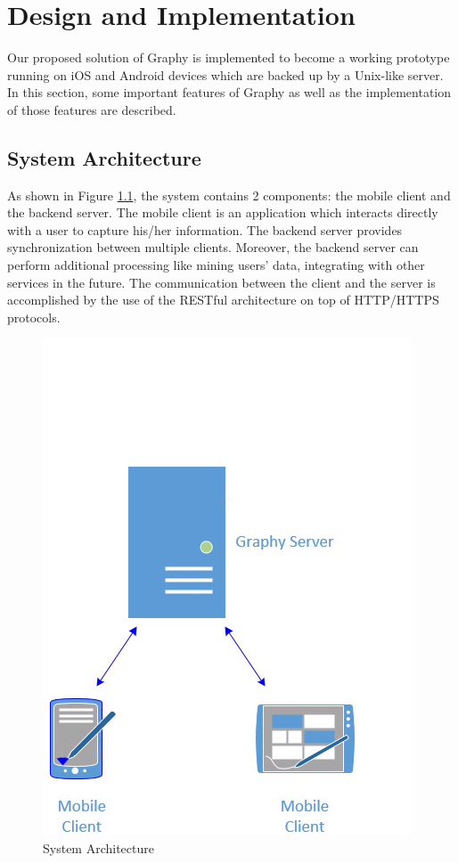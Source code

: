\chapter{Design and Implementation}
\label{implementation}
Our proposed solution of Graphy is implemented to become a working prototype running on iOS and Android devices which are backed up by a Unix-like server. In this section, some important features of Graphy as well as the implementation of those features are described.
\section{System Architecture}
As shown in Figure \ref{fg:architecture}, the system contains 2 components: the mobile client and the backend server. The mobile client is an application which interacts directly with a user to capture his/her information. The backend server provides synchronization between multiple clients. Moreover, the backend server can perform additional processing like mining users' data, integrating with other services in the future. The communication between the client and the server is accomplished by the use of the RESTful architecture on top of HTTP/HTTPS protocols.

\begin{figure}[!h]
\begin{centering}
\includegraphics[scale=0.6]{pics/architecture}
\caption{System Architecture}\label{fg:architecture}
\end{centering}
\end{figure}

